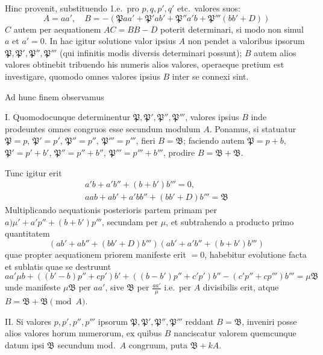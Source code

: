 \documentclass[12pt,a4paper]{article}
\theoremstyle{plain}
\theoremstyle{definition}
\theoremstyle{remark}
\theoremstyle{problemstyle}
\begin{document}
Hinc provenit, substituendo 1.e.\ pro $p, q, p', q'$ etc.\ valores suos:
\[
A = aa', \quad B = -(\mathfrak{P}aa' + \mathfrak{P}'ab' + \mathfrak{P}''a'b + \mathfrak{P}'''(bb' + D))
\]
$C$ autem per aequationem $AC = BB - D$ poterit determinari, si modo non simul $a$ et $a' = 0$. In hac igitur solutione valor ipsius $A$ non pendet a valoribus ipsorum $\mathfrak{P}, \mathfrak{P}', \mathfrak{P}'', \mathfrak{P}'''$ (qui infinitis modis diversis determinari possunt); $B$ autem alios valores obtinebit tribuendo his numeris alios valores, operaeque pretium est investigare, quomodo omnes valores ipsius $B$ inter se connexi sint.

Ad hunc finem observamus

I. Quomodocunque determinentur $\mathfrak{P}, \mathfrak{P}', \mathfrak{P}'', \mathfrak{P}'''$, valores ipsius $B$ inde prodeuntes omnes congruos esse secundum modulum $A$. Ponamus, si statuatur $\mathfrak{P} = p$, $\mathfrak{P}' = p'$, $\mathfrak{P}'' = p''$, $\mathfrak{P}''' = p'''$, fieri $B = \mathfrak{B}$; faciendo autem $\mathfrak{P} = p + b$, $\mathfrak{P}' = p' + b'$, $\mathfrak{P}'' = p'' + b''$, $\mathfrak{P}''' = p''' + b'''$, prodire $B = \mathfrak{B} + \mathfrak{B}$.

Tunc igitur erit
\begin{gather*}
a'b + a'b'' + (b + b')b''' = 0, \\
aab + ab' + a'bb'' + (bb' + D)b''' = \mathfrak{B}
\end{gather*}
Multiplicando aequationis posterioris partem primam per $a)\mu' + a'p'' + (b+b')p'''$, secundam per $\mu$, et subtrahendo a producto primo quantitatem
\[
(ab' + ab'' + (bb' + D)b''')(ab' + a'b'' + (b+b')b''')
\]
quae propter aequationem priorem manifeste erit $= 0$, habebitur evolutione facta et sublatis quae se destruunt
\[
aa'\mu b + ((b' - b)p'' + cp')b' + ((b - b')p'' + c'p')b'' - (c'p'' + cp''')b''' = \mu\mathfrak{B}
\]
unde manifeste $\mu\mathfrak{B}$ per $aa'$, sive $\mathfrak{B}$ per $\tfrac{aa'}{\mu}$ i.e.\ per $A$ divisibilis erit, atque $B = \mathfrak{B} + \mathfrak{B} \pmod{A}$.

II. Si valores $p, p', p'', p'''$ ipsorum $\mathfrak{P}, \mathfrak{P}', \mathfrak{P}'', \mathfrak{P}'''$ reddant $B = \mathfrak{B}$, inveniri posse alios valores horum numerorum, ex quibus $B$ nanciscatur valorem quemcunque datum ipsi $\mathfrak{B}$ secundum mod.\ $A$ congruum, puta $\mathfrak{B} + kA$.
\end{document}
